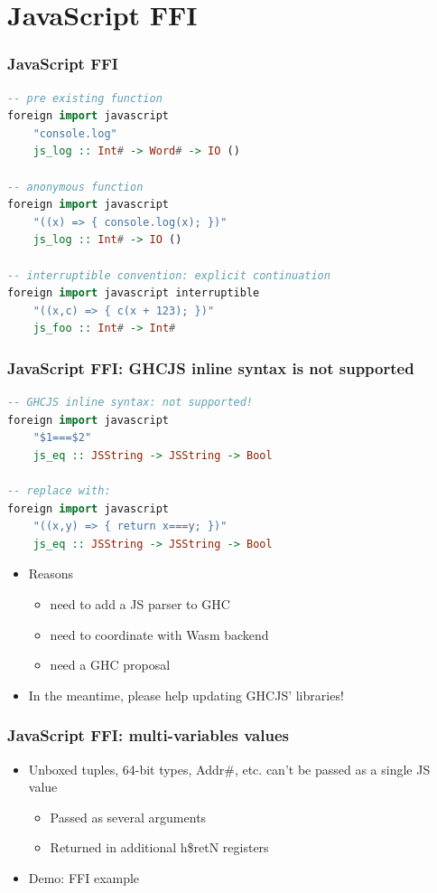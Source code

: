 \documentclass{beamer}
\begin{document}
\section{JavaScript FFI}

\begin{frame}[fragile]
\frametitle{JavaScript FFI}

\begin{lstlisting}[language=haskell]
-- pre existing function
foreign import javascript
    "console.log"
    js_log :: Int# -> Word# -> IO ()

-- anonymous function
foreign import javascript
    "((x) => { console.log(x); })"
    js_log :: Int# -> IO ()

-- interruptible convention: explicit continuation
foreign import javascript interruptible
    "((x,c) => { c(x + 123); })"
    js_foo :: Int# -> Int#
\end{lstlisting}

\end{frame}


\begin{frame}[fragile]
\frametitle{JavaScript FFI: GHCJS inline syntax is not supported}

\begin{lstlisting}[language=haskell]
-- GHCJS inline syntax: not supported!
foreign import javascript
    "$1===$2"
    js_eq :: JSString -> JSString -> Bool

-- replace with:
foreign import javascript
    "((x,y) => { return x===y; })"
    js_eq :: JSString -> JSString -> Bool

\end{lstlisting}

  \begin{itemize}
    \item Reasons
      \begin{itemize}
        \item need to add a JS parser to GHC
        \item need to coordinate with Wasm backend
        \item need a GHC proposal
      \end{itemize}
    \item In the meantime, please help updating GHCJS' libraries!
  \end{itemize}

\end{frame}


\begin{frame}[fragile]
  \frametitle{JavaScript FFI: multi-variables values}
  \begin{itemize}
    \item Unboxed tuples, 64-bit types, Addr\#, etc. can’t be passed as a single JS value
      \begin{itemize}
    \item Passed as several arguments
    \item Returned in additional h\$retN registers
      \end{itemize}
    \item Demo: FFI example
  \end{itemize}

\end{frame}
\end{document}
